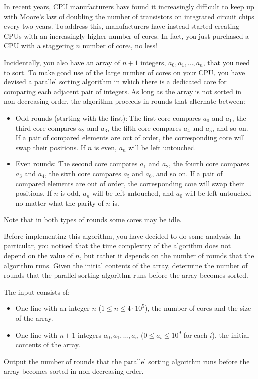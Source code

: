 
%
In recent years, CPU manufacturers have found it increasingly difficult to keep
up with Moore's law of doubling the number of transistors on integrated circuit
chips every two years. To address this, manufacturers have instead started
creating CPUs with an increasingly higher number of cores. In fact, you just
purchased a CPU with a staggering $n$ number of cores, no less!

Incidentally, you also have an array of $n+1$ integers, $a_0, a_1, \ldots, a_n$,
that you need to sort. To make good use of the large number of cores on your
CPU, you have devised a parallel sorting algorithm in which there is a dedicated
core for comparing each adjacent pair of integers. As long as the array is not
sorted in non-decreasing order, the algorithm proceeds in rounds that alternate between:

\begin{itemize}
\item Odd rounds (starting with the first): The first core compares $a_0$ and
$a_1$, the third core compares $a_2$ and $a_3$, the fifth core compares $a_4$
and $a_5$, and so on. If a pair of compared elements are out of order, the
corresponding core will swap their positions. If $n$ is even, $a_n$ will be left
untouched.

\item Even rounds: The second core compares $a_1$ and $a_2$, the fourth core
compares $a_3$ and $a_4$, the sixth core compares $a_5$ and $a_6$, and so on.
If a pair of compared elements are out of order, the corresponding core will
swap their positions. If $n$ is odd, $a_n$ will be left untouched, and $a_0$
will be left untouched no matter what the parity of $n$ is.
\end{itemize}
Note that in both types of rounds some cores may be idle.

Before implementing this algorithm, you have decided to do some analysis. In
particular, you noticed that the time complexity of the algorithm does not
depend on the value of $n$, but rather it depends on the number of rounds that
the algorithm runs. Given the initial contents of the array, determine the
number of rounds that the parallel sorting algorithm runs before the array
becomes sorted.

\begin{Input}
The input consists of:
\begin{itemize}
\item One line with an integer $n$ ($1 \leq n \leq 4\cdot10^5$), the number of cores
and the size of the array.
\item One line with $n+1$ integers $a_0, a_1, \ldots, a_n$
($0 \leq a_i \leq 10^9$ for each $i$), the initial contents of the array.
\end{itemize}
\end{Input}

\begin{Output}
Output the number of rounds that the parallel sorting algorithm runs before the
array becomes sorted in non-decreasing order.
\end{Output}

